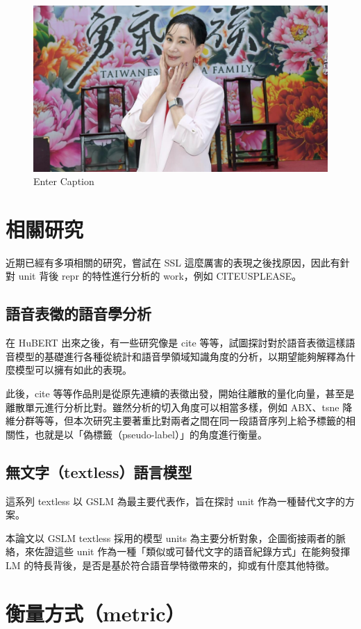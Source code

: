 \begin{figure}
    \centering
    \includegraphics[width=0.5\linewidth]{figures/20240511141026-0fed3f0a.jpg}
    \caption{Enter Caption}
    \label{fig:enter-label}
\end{figure}



\section{相關研究}
近期已經有多項相關的研究，嘗試在 SSL 這麼厲害的表現之後找原因，因此有針對 unit 背後 repr 的特性進行分析的 work，例如 CITEUSPLEASE。 

\subsection{語音表徵的語音學分析}
在 HuBERT 出來之後，有一些研究像是 cite 等等，試圖探討對於語音表徵這樣語音模型的基礎進行各種從統計和語音學領域知識角度的分析，以期望能夠解釋為什麼模型可以擁有如此的表現。

此後，cite 等等作品則是從原先連續的表徵出發，開始往離散的量化向量，甚至是離散單元進行分析比對。雖然分析的切入角度可以相當多樣，例如 ABX、tsne 降維分群等等，但本次研究主要著重比對兩者之間在同一段語音序列上給予標籤的相關性，也就是以「偽標籤（pseudo-label）」的角度進行衡量。

\subsection{無文字（textless）語言模型}

這系列 textless 以 GSLM 為最主要代表作，旨在探討 unit 作為一種替代文字的方案。

本論文以 GSLM textless 採用的模型 units 為主要分析對象，企圖銜接兩者的脈絡，來佐證這些 unit 作為一種「類似或可替代文字的語音紀錄方式」在能夠發揮 LM 的特長背後，是否是基於符合語音學特徵帶來的，抑或有什麼其他特徵。

\section{衡量方式（metric）}

